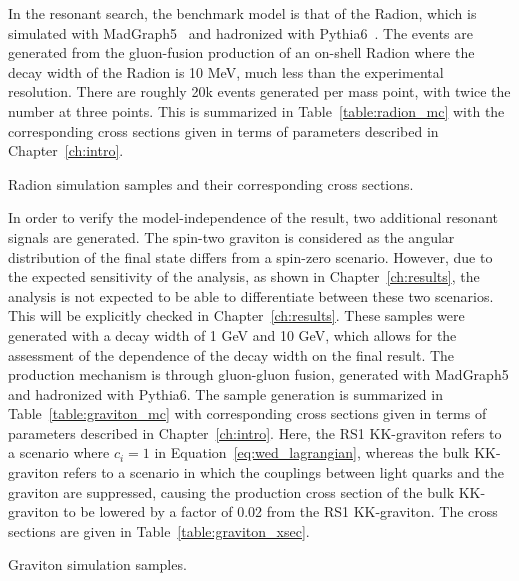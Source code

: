 In the resonant search, the benchmark model is that of the Radion, which is simulated with
MadGraph5~\cite{Madgraph_Alwall:2011uj} and hadronized with Pythia6~\cite{Pythia6-0}. The events are
generated from the gluon-fusion production of an on-shell Radion where the decay width of the Radion
is 10 MeV, much less than the experimental resolution. There are roughly
20k events generated per mass point, with twice the number at three points.
This is summarized in Table~\ref{table:radion_mc} with the corresponding cross sections given in terms
of parameters described in Chapter~\ref{ch:intro}.

\begin{table}[htbp!]
  \centering
  \renewcommand{\arraystretch}{1.4}
  \caption{Radion simulation samples and their corresponding cross sections.}
  
  \label{table:radion_mc}
\end{table}

In order to verify the model-independence of the result, two additional resonant signals
are generated.
The spin-two graviton is considered as the angular distribution of the final state differs from a
spin-zero scenario. However, due to the expected sensitivity of the analysis, as shown in
Chapter~\ref{ch:results}, the analysis is not expected to be able to differentiate between
these two scenarios. This will be explicitly checked in Chapter~\ref{ch:results}.
These samples were generated with a decay width of 1 GeV and 10 GeV,
which allows for the assessment of the
dependence of the decay width on the final result. The production mechanism is through
gluon-gluon fusion, generated with MadGraph5 and hadronized with Pythia6. The sample generation
is summarized in Table~\ref{table:graviton_mc} with corresponding cross sections given in terms of
parameters described in Chapter~\ref{ch:intro}. Here, the RS1 KK-graviton refers to a scenario
where $c_i = 1$ in Equation~\ref{eq:wed_lagrangian}, whereas the bulk KK-graviton refers to a scenario
in which the couplings between light quarks and the graviton are suppressed, causing the
production cross section of the bulk KK-graviton to be lowered by a factor of 0.02 from the
RS1 KK-graviton. The cross sections are given in Table~\ref{table:graviton_xsec}.

\begin{table}[htbp!]
  \centering
  \renewcommand{\arraystretch}{1.4}
  \caption{Graviton simulation samples.}
  
  \label{table:graviton_mc}
\end{table}

